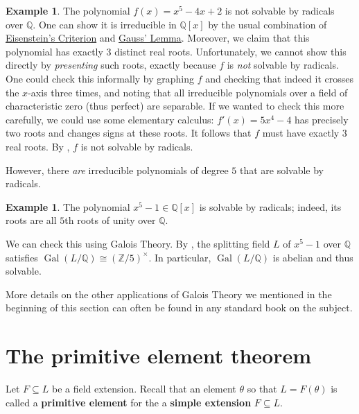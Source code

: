 \documentclass[12pt]{report}
\numberwithin{equation}{section}
\numberwithin{theorem}{chapter}
\theoremstyle{definition}
\newtheorem{example}[theorem]{Example}
\newtheorem*{basic properties}{Basic Properties}
\newtheorem*{Important Remark}{Important Remark}
\newcommand{\df}[1]{{\bf #1}\index{#1}}
\DeclareMathOperator{\Gal}{Gal}
\begin{document}
\begin{example} 
The polynomial $f(x) = x^5 - 4x + 2$ is not solvable by radicals over $\mathbb{Q}$.
One can show it is irreducible in $\mathbb{Q}[x]$ by the usual combination of \hyperref[eisenstein criterion]{Eisenstein's Criterion} and \hyperref[Gauss Lemma]{Gauss' Lemma}. Moreover, we claim that this polynomial has exactly $3$ distinct real roots. Unfortunately, we cannot show this directly by \emph{presenting} such roots, exactly because $f$ is \emph{not} solvable by radicals. One could check this informally by graphing $f$ and checking that indeed it crosses the $x$-axis three times, and noting that all irreducible polynomials over a field of characteristic zero (thus perfect) are separable. If we wanted to check this more carefully, we could use some elementary calculus: $f'(x) = 5x^4 - 4$ has precisely two roots and changes signs at these roots. It follows that $f$ must have exactly $3$ real roots. By , $f$ is not solvable by radicals.
\end{example}

However, there \emph{are} irreducible polynomials of degree $5$ that are solvable by radicals.

\begin{example}
	The polynomial $x^5-1 \in \mathbb{Q}[x]$ is solvable by radicals; indeed, its roots are all $5$th roots of unity over $\mathbb{Q}$.	
	
	We can check this using Galois Theory. By , the splitting field $L$ of $x^5-1$ over $\mathbb{Q}$ satisfies $\Gal(L/\mathbb{Q}) \cong (\mathbb{Z}/5)^\times$. In particular, $\Gal(L/\mathbb{Q})$ is abelian and thus solvable.
\end{example}


More details on the other applications of Galois Theory we mentioned in the beginning of this section can often be found in any standard book on the subject.




\section{The primitive element theorem}


Let $F \subseteq L$ be a field extension. Recall that an element $\theta$ so that $L=F(\theta)$ is called a \df{primitive element} for the a \df{simple extension} $F \subseteq L$.
\end{document}
